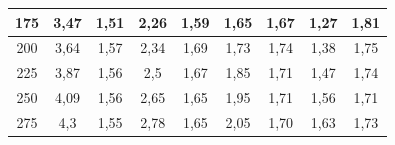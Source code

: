 \documentclass{article}
\begin{document}
\begin{table}[hb]
\begin{tabular}{|c|c|c|c|c|c|c|c|c|}
175                              & 3,47                                   & 1,51                                                                                  & 2,26                                   & 1,59                                                                                  & 1,65                                   & 1,67                                                                                  & 1,27                                   & 1,81                                                                                  \\ \hline
200                              & 3,64                                   & 1,57                                                                                  & 2,34                                   & 1,69                                                                                  & 1,73                                   & 1,74                                                                                  & 1,38                                   & 1,75                                                                                  \\ \hline
225                              & 3,87                                   & 1,56                                                                                  & 2,5                                    & 1,67                                                                                  & 1,85                                   & 1,71                                                                                  & 1,47                                   & 1,74                                                                                  \\ \hline
250                              & 4,09                                   & 1,56                                                                                  & 2,65                                   & 1,65                                                                                  & 1,95                                   & 1,71                                                                                  & 1,56                                   & 1,71                                                                                  \\ \hline
275                              & 4,3                                    & 1,55                                                                                  & 2,78                                   & 1,65                                                                                  & 2,05                                   & 1,70                                                                                  & 1,63                                   & 1,73                                                                                  \\ \hline

\end{tabular}
\end{table}
\end{document}
